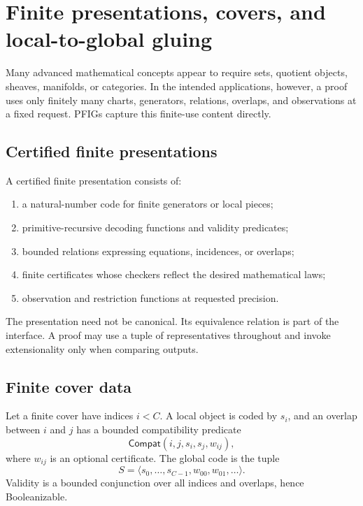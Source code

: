 \section{Finite presentations, covers, and local-to-global gluing}
\label{sec:gluing}

Many advanced mathematical concepts appear to require sets, quotient objects, sheaves, manifolds, or categories.  In the intended applications, however, a proof uses only finitely many charts, generators, relations, overlaps, and observations at a fixed request.  PFIGs capture this finite-use content directly.

\subsection{Certified finite presentations}

A certified finite presentation consists of:

\begin{enumerate}
\item a natural-number code for finite generators or local pieces;
\item primitive-recursive decoding functions and validity predicates;
\item bounded relations expressing equations, incidences, or overlaps;
\item finite certificates whose checkers reflect the desired mathematical laws;
\item observation and restriction functions at requested precision.
\end{enumerate}

The presentation need not be canonical.  Its equivalence relation is part of the interface.  A proof may use a tuple of representatives throughout and invoke extensionality only when comparing outputs.

\subsection{Finite cover data}

Let a finite cover have indices \(i<C\).  A local object is coded by \(s_i\), and an overlap between \(i\) and \(j\) has a bounded compatibility predicate
\[
  \mathsf{Compat}(i,j,s_i,s_j,w_{ij}),
\]
where \(w_{ij}\) is an optional certificate.  The global code is the tuple
\[
  S=\langle s_0,\ldots,s_{C-1},w_{00},w_{01},\ldots\rangle.
\]
Validity is a bounded conjunction over all indices and overlaps, hence Booleanizable.


